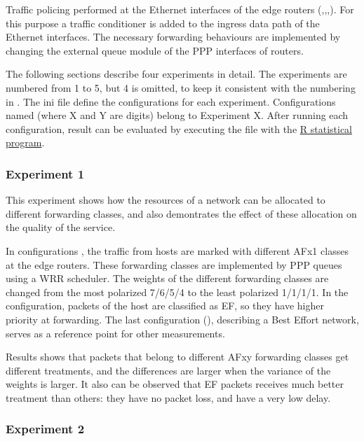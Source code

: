 Traffic policing performed at the Ethernet interfaces of the edge routers
(,,,). For this purpose a traffic conditioner
is added to the ingress data path of the Ethernet interfaces. The necessary
forwarding behaviours are implemented by changing the external queue module
of the PPP interfaces of routers.

The following sections describe four experiments in detail. The experiments
are numbered from 1 to 5, but 4 is omitted, to keep it consistent with the
numbering in \cite{Sanjay2010}.
The ini file define the configurations for each experiment. Configurations
named  (where X and Y are digits) belong to Experiment X.
After running each configuration, result can be evaluated by executing
the  file with the
\href{http://www.r-project.org}{R statistical program}.

\subsubsection*{Experiment 1}

This experiment shows how the resources of a network can be allocated
to different forwarding classes, and also demontrates the effect of
these allocation on the quality of the service.

In configurations , the traffic from hosts 
are marked with different AFx1 classes at the edge routers. These
forwarding classes are implemented by PPP queues using a WRR scheduler.
The weights of the different forwarding classes are changed from the most
polarized 7/6/5/4 to the least polarized 1/1/1/1. In the 
configuration, packets of the  host are classified as EF, so
they have higher priority at forwarding. The last configuration
(), describing a Best Effort network, serves as a reference
point for other measurements.

Results shows that packets that belong to different AFxy forwarding classes get
different treatments, and the differences are larger when the variance
of the weights is larger. It also can be observed that EF packets
receives much better treatment than others: they have no packet loss,
and have a very low delay.

\subsubsection*{Experiment 2}

